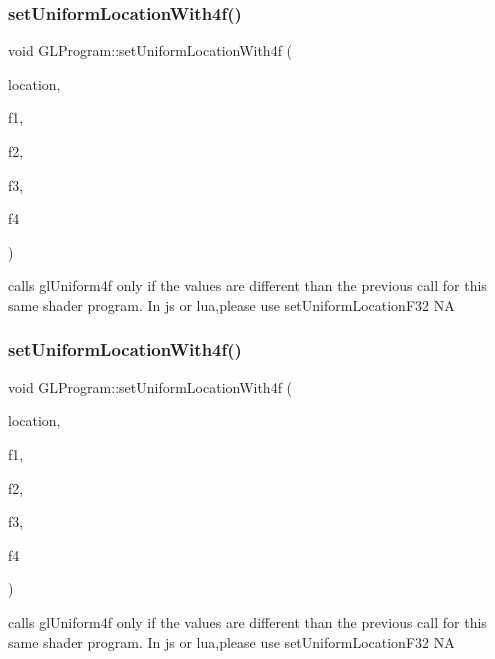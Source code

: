 \subsubsection{\texorpdfstring{set\+Uniform\+Location\+With4f()}{setUniformLocationWith4f()}\hspace{0.1cm}{\footnotesize\ttfamily [1/2]}}
{\footnotesize\ttfamily void G\+L\+Program\+::set\+Uniform\+Location\+With4f (\begin{DoxyParamCaption}\item[{G\+Lint}]{location,  }\item[{G\+Lfloat}]{f1,  }\item[{G\+Lfloat}]{f2,  }\item[{G\+Lfloat}]{f3,  }\item[{G\+Lfloat}]{f4 }\end{DoxyParamCaption})}

calls gl\+Uniform4f only if the values are different than the previous call for this same shader program. In js or lua,please use set\+Uniform\+Location\+F32  NA \mbox{\label{classGLProgram_aae6350415e7f86969daa6de160859cf3}} 
\subsubsection{\texorpdfstring{set\+Uniform\+Location\+With4f()}{setUniformLocationWith4f()}\hspace{0.1cm}{\footnotesize\ttfamily [2/2]}}
{\footnotesize\ttfamily void G\+L\+Program\+::set\+Uniform\+Location\+With4f (\begin{DoxyParamCaption}\item[{G\+Lint}]{location,  }\item[{G\+Lfloat}]{f1,  }\item[{G\+Lfloat}]{f2,  }\item[{G\+Lfloat}]{f3,  }\item[{G\+Lfloat}]{f4 }\end{DoxyParamCaption})}

calls gl\+Uniform4f only if the values are different than the previous call for this same shader program. In js or lua,please use set\+Uniform\+Location\+F32  NA \mbox{\label{classGLProgram_a1ec5c5f3d024757f9c35e4bff362a3ee}} 
